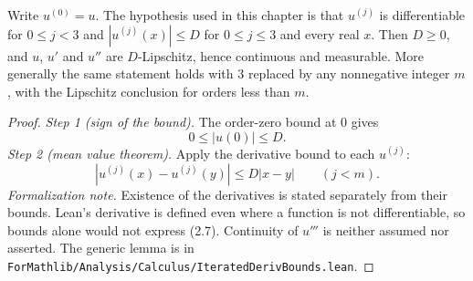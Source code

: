 \begin{lemma}\label{lem:sg-tal:perceptron-regularity}
  \leanok
{}
Write $u^{(0)}=u$. The hypothesis used in this chapter is that $u^{(j)}$ is differentiable for
$0\le j<3$ and $|u^{(j)}(x)|\le D$ for $0\le j\le3$ and every real $x$.
Then $D\ge0$, and $u$, $u'$ and $u''$ are $D$-Lipschitz, hence continuous and measurable.
More generally the same statement holds with $3$ replaced by any nonnegative integer $m$,
with the Lipschitz conclusion for orders less than $m$.
\end{lemma}
\begin{proof}
  \leanok
\emph{Step 1 (sign of the bound).} The order-zero bound at $0$ gives
\[
 0\le |u(0)|\le D.
\]
\emph{Step 2 (mean value theorem).} Apply the derivative bound to each $u^{(j)}$:
\[
 |u^{(j)}(x)-u^{(j)}(y)|\le D|x-y|\qquad(j<m).
\]
\emph{Formalization note.} Existence of the derivatives is stated separately from their bounds.
Lean's derivative is defined even where a function is not differentiable, so bounds alone would
not express (2.7). Continuity of $u'''$ is neither assumed nor asserted. The generic lemma is in
\texttt{ForMathlib/Analysis/Calculus/IteratedDerivBounds.lean}.
\end{proof}

